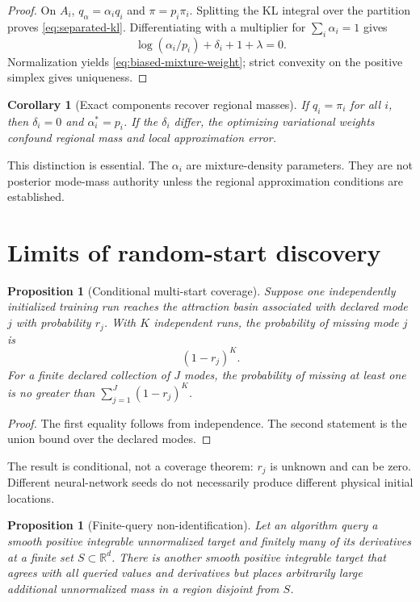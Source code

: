 \documentclass[11pt]{article}
\newtheorem{proposition}[theorem]{Proposition}
\newtheorem{corollary}[theorem]{Corollary}
\theoremstyle{definition}
\theoremstyle{remark}
\newcommand{\R}{\mathbb{R}}
\newcommand{\1}{\mathbf{1}}
\begin{document}
\begin{proof}
On $A_i$, $q_\alpha=\alpha_iq_i$ and $\pi=p_i\pi_i$.  Splitting the KL
integral over the partition proves \eqref{eq:separated-kl}.  Differentiating
with a multiplier for $\sum_i\alpha_i=1$ gives
\[
 \log(\alpha_i/p_i)+\delta_i+1+\lambda=0.
\]
Normalization yields \eqref{eq:biased-mixture-weight}; strict convexity on the
positive simplex gives uniqueness.
\end{proof}

\begin{corollary}[Exact components recover regional masses]
\label{cor:exact-regional-masses}
If $q_i=\pi_i$ for all $i$, then $\delta_i=0$ and
$\alpha_i^*=p_i$.  If the $\delta_i$ differ, the optimizing variational weights
confound regional mass and local approximation error.
\end{corollary}

This distinction is essential.  The $\alpha_i$ are mixture-density parameters.
They are not posterior mode-mass authority unless the regional approximation
conditions are established.

\section{Limits of random-start discovery}

\begin{proposition}[Conditional multi-start coverage]
\label{prop:multistart}
Suppose one independently initialized training run reaches the attraction basin
associated with declared mode $j$ with probability $r_j$.  With $K$
independent runs, the probability of missing mode $j$ is
\begin{equation}
 (1-r_j)^K.
 \label{eq:mode-miss-probability}
\end{equation}
For a finite declared collection of $J$ modes, the probability of missing at
least one is no greater than
$\sum_{j=1}^J(1-r_j)^K$.
\end{proposition}

\begin{proof}
The first equality follows from independence.  The second statement is the
union bound over the declared modes.
\end{proof}

The result is conditional, not a coverage theorem: $r_j$ is unknown and can be
zero.  Different neural-network seeds do not necessarily produce different
physical initial locations.

\begin{proposition}[Finite-query non-identification]
\label{prop:finite-query}
Let an algorithm query a smooth positive integrable unnormalized target and
finitely many of its derivatives at a finite set $S\subset\R^d$.  There is
another smooth positive integrable target that agrees with all queried values
and derivatives but places arbitrarily large additional unnormalized mass in a
region disjoint from $S$.
\end{proposition}
\end{document}
